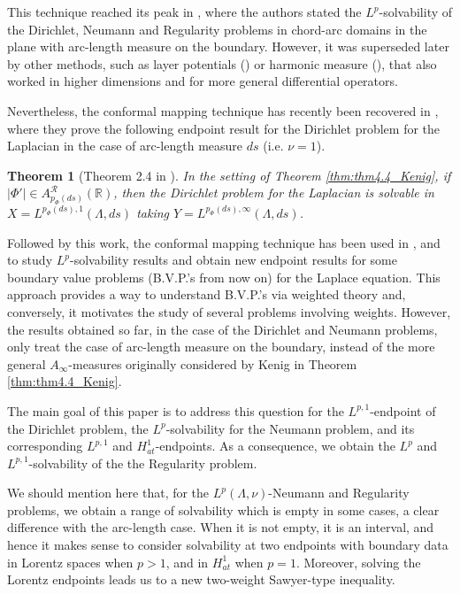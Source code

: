 \documentclass[12pt]{amsart}
\newcommand{\R}{\mathbb{R}}
\theoremstyle{plain}
\newtheorem{theorem}{Theorem}[section]
\theoremstyle{definition}
\numberwithin{equation}{section}
\begin{document}
This technique reached its peak in \cite{jerisonKenig}, where the authors stated the $L^p$-solvability of the Dirichlet, Neumann and Regularity problems in chord-arc domains in the plane with arc-length measure on the boundary. However, it was superseded later by other methods, such as layer potentials (\cite{VerchotaLayer, DahlbergKenig}) or harmonic measure (\cite{JK1982,FJK1984}), that also worked in higher dimensions and for more general differential operators.

Nevertheless, the conformal mapping technique has recently been recovered in \cite{CarroOrtiz}, where they prove the following endpoint result for the Dirichlet problem for the Laplacian in the case of arc-length measure $ds$ (i.e. $\nu=1$). 

\begin{theorem}[Theorem 2.4 in \cite{CarroOrtiz}]\label{thm:thm2.4_CarroOrtiz}
    In the setting of Theorem \ref{thm:thm4.4_Kenig}, if $|\Phi'|\in A_{p_{\Phi}(ds)}^{\mathcal{R}}(\R)$, then the Dirichlet problem for the Laplacian is solvable in $X=L^{p_{\Phi}(ds),1}(\Lambda,ds)$ taking $Y=L^{p_{\Phi}(ds),\infty}(\Lambda,ds)$.
\end{theorem}


 Followed by this work,  the conformal mapping technique has been used in \cite{CNO}, \cite{zarembaCarro} and  \cite{transmissionCarro}  to  study $L^p$-solvability results and obtain new endpoint results for some boundary value problems (B.V.P.'s from now on) for the Laplace equation. This approach provides a way to understand B.V.P.'s  via weighted theory and, conversely, it motivates the study of several problems involving weights.  However, the results obtained so far, in the case of the Dirichlet and Neumann problems, only treat the case of arc-length measure on the boundary, instead of the more general $A_{\infty}$-measures originally considered by Kenig in Theorem \ref{thm:thm4.4_Kenig}.
 

The main goal of this paper is to address this question for the $L^{p,1}$-endpoint of the Dirichlet problem, the $L^p$-solvability for the Neumann problem, and its corresponding $L^{p,1}$ and $H_{at}^{1}$-endpoints. As a consequence, we obtain the $L^p$ and $L^{p,1}$-solvability of the the Regularity problem.
 
 We should mention here that, for the $L^p(\Lambda,\nu)$-Neumann and Regularity problems, we obtain a range of solvability which is empty in some cases, a clear difference with the arc-length case. When it is not empty, it is an interval, and hence it makes sense to consider solvability at two endpoints with boundary data in Lorentz spaces when $p>1$, and in $H_{at}^{1}$ when $p=1$. Moreover, solving the Lorentz endpoints leads us to a new two-weight Sawyer-type inequality.
\end{document}
